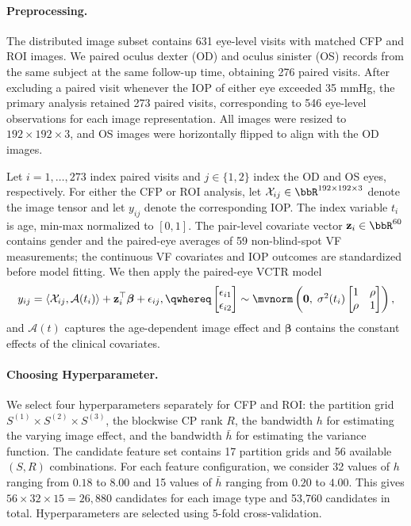\documentclass[10pt]{notes}
\begin{document}
\paragraph{Preprocessing.}
The distributed image subset contains 631 eye-level visits with matched CFP and ROI images. We paired oculus dexter (OD) and oculus sinister (OS) records from the same subject at the same follow-up time, obtaining 276 paired visits. After excluding a paired visit whenever the IOP of either eye exceeded 35 mmHg, the primary analysis retained 273 paired visits, corresponding to 546 eye-level observations for each image representation. All images were resized to $192\times192\times3$, and OS images were horizontally flipped to align with the OD images.

Let $i=1,\ldots,273$ index paired visits and $j\in\{1,2\}$ index the OD and OS eyes, respectively. For either the CFP or ROI analysis, let $\mathcal{X}_{ij}\in\bbR^{192\times192\times3}$ denote the image tensor and let $y_{ij}$ denote the corresponding IOP. The index variable $t_i$ is age, min-max normalized to $[0,1]$. The pair-level covariate vector $\mathbf{z}_i\in\bbR^{60}$ contains gender and the paired-eye averages of 59 non-blind-spot VF measurements; the continuous VF covariates and IOP outcomes are standardized before model fitting. We then apply the paired-eye VCTR model
\begin{align*}
    y_{ij}
    = \left\langle \mathcal{X}_{ij},\mathcal{A}(t_i)\right\rangle
    + \mathbf{z}_i^\top\boldsymbol{\beta}
    + \epsilon_{ij},
    \qwhereq
    \begin{bmatrix}
        \epsilon_{i1}\\
        \epsilon_{i2}
    \end{bmatrix}
    \sim
    \mvnorm\begin{pmatrix}
        \mathbf{0},\;
        \sigma^2(t_i)
        \begin{bmatrix}
            1 & \rho\\
            \rho & 1
        \end{bmatrix}
    \end{pmatrix},
\end{align*}
and $\mathcal{A}(t)$ captures the age-dependent image effect and $\boldsymbol{\beta}$ contains the constant effects of the clinical covariates. 

\paragraph{Choosing Hyperparameter.}
We select four hyperparameters separately for CFP and ROI: the partition grid $S^{(1)}\times S^{(2)}\times S^{(3)}$, the blockwise CP rank $R$, the bandwidth $h$ for estimating the varying image effect, and the bandwidth $\bar h$ for estimating the variance function. The candidate feature set contains 17 partition grids and 56 available $(S,R)$ combinations. For each feature configuration, we consider 32 values of $h$ ranging from $0.18$ to $8.00$ and 15 values of $\bar h$ ranging from $0.20$ to $4.00$. This gives $56\times32\times15=26{,}880$ candidates for each image type and 53,760 candidates in total. Hyperparameters are selected using 5-fold cross-validation. 
\end{document}
